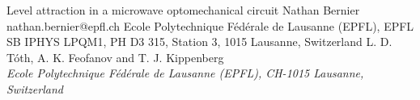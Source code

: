 \begin{conf-abstract}[]
{Level attraction in a microwave optomechanical circuit}
{\color{blue} Nathan Bernier}
{nathan.bernier@epfl.ch}
{Ecole Polytechnique Fédérale de Lausanne (EPFL), EPFL SB IPHYS LPQM1, PH D3 315, Station 3, 1015 Lausanne, Switzerland}
{{\color{blue}L. D. Tóth, A. K. Feofanov and T. J. Kippenberg}\\ \textit{Ecole Polytechnique Fédérale de Lausanne (EPFL), CH-1015 Lausanne, Switzerland}\\ 
\decofourleft \decofourright}





\printbibliography[heading=none]

\end{conf-abstract}

